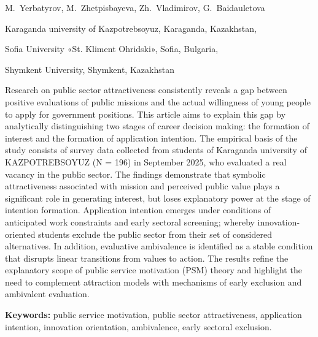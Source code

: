 
\begin{header}

M.~Yerbatyrov,
M.~Zhetpisbayeva,
Zh.~Vladimirov,
G.~Baidauletova\envelope
\end{header}

\begin{affil}
Karaganda university of Kazpotrebsoyuz, Karaganda, Kazakhstan,

Sofia University «St. Kliment Ohridski», Sofia, Bulgaria,

Shymkent University, Shymkent, Kazakhstan

\end{affil}

Research on public sector attractiveness consistently reveals a gap
between positive evaluations of public missions and the actual
willingness of young people to apply for government positions. This
article aims to explain this gap by analytically distinguishing two
stages of career decision making: the formation of interest and the
formation of application intention. The empirical basis of the study
consists of survey data collected from students of Karaganda university
of KAZPOTREBSOYUZ (N = 196) in September 2025, who evaluated a real
vacancy in the public sector. The findings demonstrate that symbolic
attractiveness associated with mission and perceived public value plays
a significant role in generating interest, but loses explanatory power
at the stage of intention formation. Application intention emerges under
conditions of anticipated work constraints and early sectoral screening;
whereby innovation-oriented students exclude the public sector from
their set of considered alternatives. In addition, evaluative
ambivalence is identified as a stable condition that disrupts linear
transitions from values to action. The results refine the explanatory
scope of public service motivation (PSM) theory and highlight the need
to complement attraction models with mechanisms of early exclusion and
ambivalent evaluation.

{\bfseries Keywords:} public service motivation, public sector
attractiveness, application intention, innovation orientation,
ambivalence, early sectoral exclusion.

